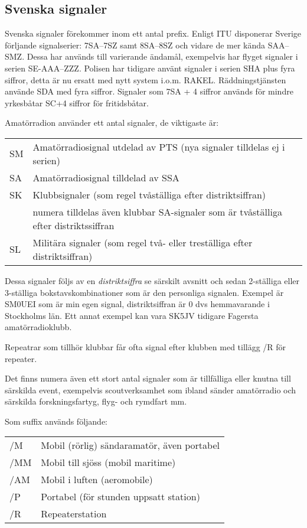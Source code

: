 \subsection{Svenska signaler}

Svenska signaler förekommer inom ett antal prefix. Enligt ITU disponerar Sverige
förljande signalserier: 7SA--7SZ samt 8SA--8SZ och vidare de mer kända SAA--SMZ.
Dessa har används till varierande ändamål, exempelvis har flyget signaler i
serien SE-AAA--ZZZ. Polisen har tidigare använt signaler i serien SHA plus fyra
siffror, detta är nu ersatt med nytt system i.o.m. RAKEL. Räddningstjänsten
använde SDA med fyra siffror. Signaler som 7SA + 4 siffror används för mindre
yrkesbåtar SC+4 siffror för fritidsbåtar.

Amatörradion använder ett antal signaler, de viktigaste är:

\begin{tabular}{ll}
	SM & Amatörradiosignal utdelad av PTS (nya signaler tilldelas ej i
        serien) \\ SA & Amatörradiosignal tilldelad av SSA \\ SK & Klubbsignaler
        (som regel tvåställiga efter distriktsiffran) \\ & numera tilldelas även
        klubbar SA-signaler som är tvåställiga efter distriktssiffran \\ SL &
        Militära signaler (som regel två- eller treställiga efter
        distriktsiffran)
\end{tabular}

Dessa signaler följs av en \textit{distriktsiffra} se särskilt avsnitt och sedan
2-ställiga eller 3-ställiga bokstavskombinationer som är den personliga
signalen. Exempel är SM0UEI som är min egen signal, distriktsiffran är 0 dvs
hemmavarande i Stockholms län. Ett annat exempel kan vara SK5JV tidigare
Fagersta amatörradioklubb.

Repeatrar som tillhör klubbar får ofta signal efter klubben med tillägg /R för
repeater.

Det finns numera även ett stort antal signaler som är tillfälliga eller knutna
till särskilda event, exempelvis scoutverksamhet som ibland sänder amatörradio
och särskilda forskningsfartyg, flyg- och rymdfart mm.

Som suffix används följande:

\begin{tabular}{ll}
	/M  & Mobil (rörlig) sändaramatör, även portabel \\
	/MM & Mobil till sjöss (mobil maritime)          \\
	/AM & Mobil i luften (aeromobile)                \\
	/P  & Portabel (för stunden uppsatt station)     \\
	/R  & Repeaterstation
\end{tabular}

